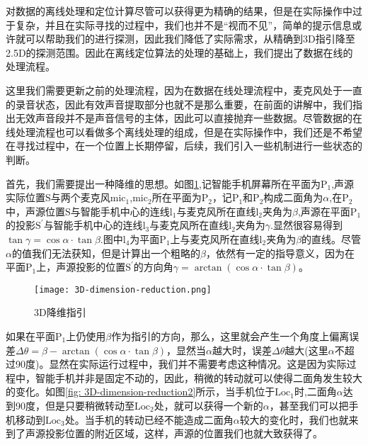 \documentclass[winfonts]{njuthesis}
\begin{document}
			对数据的离线处理和定位计算尽管可以获得更为精确的结果，但是在实际操作中过于复杂，并且在实际寻找的过程中，我们也并不是“视而不见”，简单的提示信息或许就可以帮助我们的进行探测，因此我们降低了实际需求，从精确到3D指引降至2.5D的探测范围。因此在离线定位算法的处理的基础上，我们提出了数据在线的处理流程。
		
			这里我们需要更新之前的处理流程，因为在数据在线处理流程中，麦克风处于一直的录音状态，因此有效声音提取部分也就不是那么重要，在前面的讲解中，我们指出无效声音段并不是声音信号的主体，因此可以直接抛弃一些数据。尽管数据的在线处理流程也可以看做多个离线处理的组成，但是在实际操作中，我们还是不希望在寻找过程中，在一个位置上长期停留，后续，我们引入一些机制进行一些状态的判断。
			
			首先，我们需要提出一种降维的思想。如图\ref{fig: 3D-dimension-reduction},记智能手机屏幕所在平面为$\text{P}_1$,声源实际位置$\text{S}$与两个麦克风$\text{mic}_1$,$\text{mic}_2$所在平面为$\text{P}_2$，记$\text{P}_1$和$\text{P}_2$构成二面角为$\alpha$,在$\text{P}_2$中，声源位置$\text{S}$与智能手机中心的连线$\text{l}_1$与麦克风所在直线$\text{l}_2$夹角为$\beta$,声源在平面$\text{P}_1$的投影$\text{S}^{'}$与智能手机中心的连线$\text{l}_3$与麦克风所在直线$\text{l}_2$夹角为$\gamma$.显然很容易得到$\tan \gamma = \cos \alpha \cdot \tan \beta$.图中$\text{l}_4$为平面$\text{P}_1$上与麦克风所在直线$\text{l}_2$夹角为$\beta$的直线。尽管$\alpha$的值我们无法获知，但是计算出一个粗略的$\beta$，依然有一定的指导意义，因为在平面$\text{P}_1$上，声源投影的位置$\text{S}^{'}$的方向角$\gamma = \arctan (\cos \alpha \cdot \tan \beta)$。
			
			\begin{figure}[H]
				\centering
				\texttt{[image: 3D-dimension-reduction.png]} 
				\caption{{3D降维指引}}
				\label{fig: 3D-dimension-reduction}
			\end{figure}
			
			如果在平面$\text{P}_1$上仍使用$\beta$作为指引的方向，那么，这里就会产生一个角度上偏离误差$\Delta \theta = \beta - \arctan (\cos \alpha \cdot \tan \beta)$，显然当$\alpha$越大时，误差$\Delta \theta$越大(这里$\alpha$不超过90度)。显然在实际运行过程中，我们并不需要考虑这种情况。这是因为实际过程中，智能手机并非是固定不动的，因此，稍微的转动就可以使得二面角发生较大的变化。如图\ref{fig: 3D-dimension-reduction2}所示，当手机位于$\text{Loc}_1$时,二面角$\alpha$达到90度，但是只要稍微转动至$\text{Loc}_2$处，就可以获得一个新的$\alpha$，甚至我们可以把手机移动到$\text{Loc}_3$处。当手机的转动已经不能造成二面角$\alpha$较大的变化时，我们也就来到了声源投影位置的附近区域，这样，声源的位置我们也就大致获得了。
			
\end{document}
